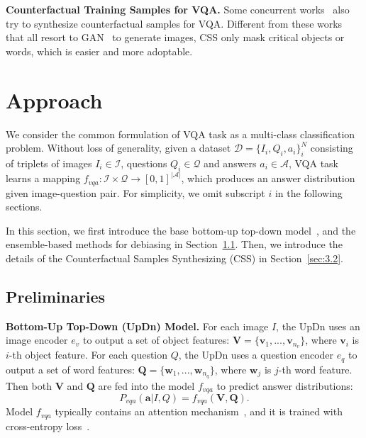 \documentclass[10pt,twocolumn,letterpaper]{article}
\begin{document}
\textbf{Counterfactual Training Samples for VQA.}
Some concurrent works~\cite{agarwal2019towards,pan2019question} also try to synthesize counterfactual samples for VQA. Different from these works that all resort to GAN~\cite{goodfellow2014generative} to generate images, CSS only mask critical objects or words, which is easier and more adoptable.

\section{Approach}

We consider the common formulation of VQA task as a multi-class classification problem. Without loss of generality, given a dataset $\mathcal{D} = \{I_i, Q_i, a_i \}^N_i$ consisting of triplets of images $I_i \in \mathcal{I}$, questions $Q_i \in \mathcal{Q}$ and answers $a_i \in \mathcal{A}$, VQA task learns a mapping $f_{vqa}: \mathcal{I} \times \mathcal{Q} \rightarrow [0, 1]^{|\mathcal{A}|}$, which produces an answer distribution given image-question pair. For simplicity, we omit subscript $i$ in the following sections.

In this section, we first introduce the base bottom-up top-down model~\cite{anderson2018bottom}, and the ensemble-based methods for debiasing in Section~\ref{sec:3.1}. Then, we introduce the details of the Counterfactual Samples Synthesizing (CSS) in Section~\ref{sec:3.2}.

\subsection{Preliminaries} \label{sec:3.1}

\noindent\textbf{Bottom-Up Top-Down (UpDn) Model.}
For each image $I$, the UpDn uses an image encoder $e_v$ to output a set of object features: $\bm{V} = \{\bm{v}_1, ..., \bm{v}_{n_v}\}$, where $\bm{v}_i$ is $i$-th object feature. For each question $Q$, the UpDn uses a question encoder $e_q$ to output a set of word features: $\bm{Q} = \{\bm{w}_1, ..., \bm{w}_{n_q}\}$, where $\bm{w}_j$ is $j$-th word feature. Then both $\bm{V}$ and $\bm{Q}$ are fed into the model $f_{vqa}$ to predict answer distributions:
\begin{equation} \label{eq:p_vqa}
	P_{vqa}(\bm{a}|I, Q) = f_{vqa}(\bm{V}, \bm{Q}).
\end{equation}
Model $f_{vqa}$ typically contains an attention mechanism~\cite{chen2017sca,niu2019recursive,ye2017video}, and it is trained with cross-entropy loss~\cite{tang2019learning,chen2019counterfactual}.
\end{document}
